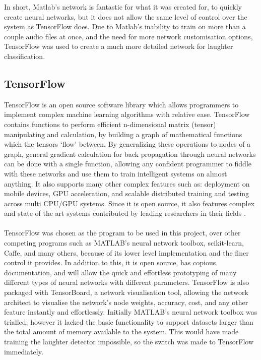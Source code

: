 \documentclass[a4paper,11pt,notitlepage]{article}
\begin{document}
\noindent
In short, Matlab's network is fantastic for what it was created for, to quickly create neural networks, but it does not allow the same level of control over the system as TensorFlow does. Due to Matlab's inability to train on more than a couple audio files at once, and the need for more network customisation options, TensorFlow was used to create a much more detailed network for laughter classification.

\subsection{TensorFlow}\label{section:Tensorflow}


TensorFlow is an open source software library which allows programmers to implement complex machine learning algorithms with relative ease. TensorFlow contains functions to perform efficient n-dimensional matrix (tensor) manipulating and calculation, by building a graph of mathematical functions which the tensors `flow' between. By generalizing these operations to nodes of a graph, general gradient calculation for back propagation through neural networks can be done with a single function, allowing any confident programmer to fiddle with these networks and use them to train intelligent systems on almost anything. It also supports many other complex features such as: deployment on mobile devices, GPU acceleration, and scalable distributed training and testing across multi CPU/GPU systems. Since it is open source, it also features complex and state of the art systems contributed by leading researchers in their fields \cite{tensorflow2015-whitepaper}.\\
\\
TensorFlow was chosen as the program to be used in this project, over other competing programs such as MATLAB's neural network toolbox, scikit-learn, Caffe, and many others, because of its lower level implementation and the finer control it provides. In addition to this, it is open source, has copious documentation, and will allow the quick and effortless prototyping of many different types of neural networks with different parameters. TensorFlow is also packaged with TensorBoard, a network visualisation tool, allowing the network architect to visualise the network's node weights, accuracy, cost, and any other feature instantly and effortlessly. Initially MATLAB's neural network toolbox was trialled, however it lacked the basic functionality to support datasets larger than the total amount of memory available to the system. This would have made training the laughter detector impossible, so the switch was made to TensorFlow immediately.
\end{document}
